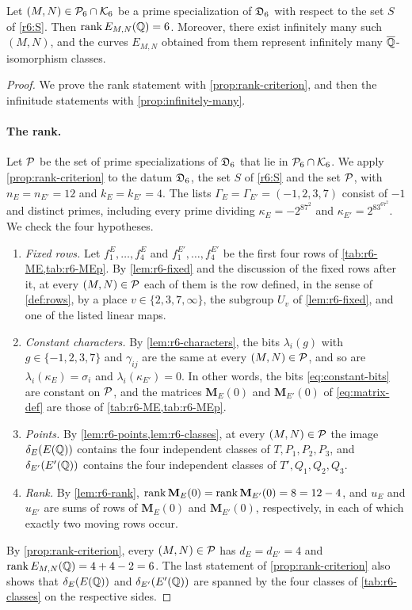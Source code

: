 \begin{theorem}\label{thm:r6}
Let $(M,N)\in\mathcal P_6\cap\mathcal K_6$ be a prime specialization of $\mathfrak D_6$ with respect to the set $S$ of \eqref{r6:S}. Then $\operatorname{rank} E_{M,N}(\mathbb Q)=6$. Moreover, there exist infinitely many such $(M,N)$, and the curves $E_{M,N}$ obtained from them represent infinitely many $\overline{\mathbb Q}$-isomorphism classes.
\end{theorem}

\begin{proof}
We prove the rank statement with \cref{prop:rank-criterion}, and then the infinitude statements with \cref{prop:infinitely-many}.

\paragraph{The rank.} Let $\mathcal P$ be the set of prime specializations of $\mathfrak D_6$ that lie in $\mathcal P_6\cap\mathcal K_6$. We apply \cref{prop:rank-criterion} to the datum $\mathfrak D_6$, the set $S$ of \eqref{r6:S} and the set $\mathcal P$, with $n_E=n_{E'}=12$ and $k_E=k_{E'}=4$. The lists $\Gamma_E=\Gamma_{E'}=(-1,2,3,7)$ consist of $-1$ and distinct primes, including every prime dividing $\kappa_E=-2^87^2$ and $\kappa_{E'}=2^83^67^2$. We check the four hypotheses.
\begin{enumerate}[label=(\roman*)]
\item \emph{Fixed rows.} Let $f^E_1,\dots,f^E_4$ and $f^{E'}_1,\dots,f^{E'}_4$ be the first four rows of \cref{tab:r6-ME,tab:r6-MEp}. By \cref{lem:r6-fixed} and the discussion of the fixed rows after it, at every $(M,N)\in\mathcal P$ each of them is the row defined, in the sense of \cref{def:rows}, by a place $v\in\{2,3,7,\infty\}$, the subgroup $U_v$ of \cref{lem:r6-fixed}, and one of the listed linear maps.
\item \emph{Constant characters.} By \cref{lem:r6-characters}, the bits $\lambda_i(g)$ with $g\in\{-1,2,3,7\}$ and $\gamma_{ij}$ are the same at every $(M,N)\in\mathcal P$, and so are $\lambda_i(\kappa_E)=\sigma_i$ and $\lambda_i(\kappa_{E'})=0$. In other words, the bits \eqref{eq:constant-bits} are constant on $\mathcal P$, and the matrices $\mathbf M_E(0)$ and $\mathbf M_{E'}(0)$ of \eqref{eq:matrix-def} are those of \cref{tab:r6-ME,tab:r6-MEp}.
\item \emph{Points.} By \cref{lem:r6-points,lem:r6-classes}, at every $(M,N)\in\mathcal P$ the image $\delta_E(E(\mathbb Q))$ contains the four independent classes of $T,P_1,P_2,P_3$, and $\delta_{E'}(E'(\mathbb Q))$ contains the four independent classes of $T',Q_1,Q_2,Q_3$.
\item \emph{Rank.} By \cref{lem:r6-rank}, $\operatorname{rank}\mathbf M_E(0)=\operatorname{rank}\mathbf M_{E'}(0)=8=12-4$, and $u_E$ and $u_{E'}$ are sums of rows of $\mathbf M_E(0)$ and $\mathbf M_{E'}(0)$, respectively, in each of which exactly two moving rows occur.
\end{enumerate}
By \cref{prop:rank-criterion}, every $(M,N)\in\mathcal P$ has $d_E=d_{E'}=4$ and $\operatorname{rank} E_{M,N}(\mathbb Q)=4+4-2=6$. The last statement of \cref{prop:rank-criterion} also shows that $\delta_E(E(\mathbb Q))$ and $\delta_{E'}(E'(\mathbb Q))$ are spanned by the four classes of \cref{tab:r6-classes} on the respective sides.


\end{proof}
